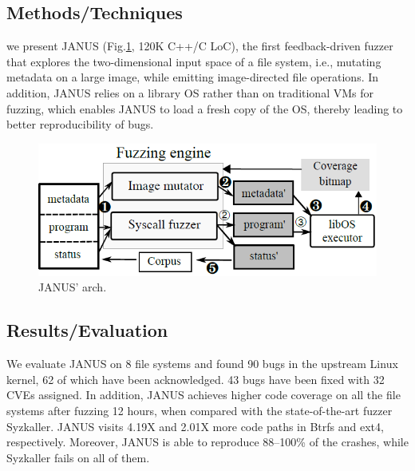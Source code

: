 \documentclass[]{article} %
\begin{document}
\subsection{Methods/Techniques}
we present JANUS (Fig.\ref{fig:janus}, 120K C++/C LoC), the first feedback-driven fuzzer
that explores the two-dimensional input space of a file system,
i.e., mutating metadata on a large image, while emitting image-directed
file operations. In addition, JANUS relies on a library
OS rather than on traditional VMs for fuzzing, which enables
JANUS to load a fresh copy of the OS, thereby leading to better
reproducibility of bugs.
\begin{figure}[h]
    \centering
    \includegraphics[scale=0.5]{janus.png} %
    \caption{JANUS' arch.}	
    \label{fig:janus}
\end{figure}
\subsection{Results/Evaluation}
We evaluate JANUS on 8 file systems
and found 90 bugs in the upstream Linux kernel, 62 of which have
been acknowledged. 43 bugs have been fixed with 32
CVEs assigned. In addition, JANUS achieves higher code coverage
on all the file systems after fuzzing 12 hours, when compared
with the state-of-the-art fuzzer Syzkaller.
JANUS visits 4.19X and 2.01X more code paths in Btrfs and ext4,
respectively. Moreover, JANUS is able to reproduce 88–100\% of
the crashes, while Syzkaller fails on all of them.
\end{document}
